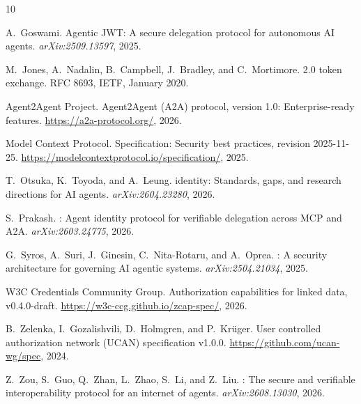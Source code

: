 \documentclass{article}
\begin{document}

\begin{thebibliography}{10}
\providecommand{\natexlab}[1]{#1}

A.~Goswami.
\newblock Agentic {JWT}: A secure delegation protocol for autonomous {AI} agents.
\newblock \emph{arXiv:2509.13597}, 2025.

M.~Jones, A.~Nadalin, B.~Campbell, J.~Bradley, and C.~Mortimore.
 2.0 token exchange.
\newblock RFC 8693, IETF, January 2020.

{Agent2Agent Project}.
\newblock Agent2{A}gent ({A}2{A}) protocol, version 1.0: Enterprise-ready features.
\newblock \url{https://a2a-protocol.org/}, 2026.

{Model Context Protocol}.
\newblock Specification: Security best practices, revision 2025-11-25.
\newblock \url{https://modelcontextprotocol.io/specification/}, 2025.

T.~Otsuka, K.~Toyoda, and A.~Leung.
 identity: Standards, gaps, and research directions for {AI} agents.
\newblock \emph{arXiv:2604.23280}, 2026.

S.~Prakash.
: Agent identity protocol for verifiable delegation across {MCP} and {A2A}.
\newblock \emph{arXiv:2603.24775}, 2026.

G.~Syros, A.~Suri, J.~Ginesin, C.~Nita-Rotaru, and A.~Oprea.
: A security architecture for governing {AI} agentic systems.
\newblock \emph{arXiv:2504.21034}, 2025.

{W3C Credentials Community Group}.
\newblock Authorization capabilities for linked data, v0.4.0-draft.
\newblock \url{https://w3c-ccg.github.io/zcap-spec/}, 2026.

B.~Zelenka, I.~Gozalishvili, D.~Holmgren, and P.~Kr\"uger.
\newblock User controlled authorization network ({UCAN}) specification v1.0.0.
\newblock \url{https://github.com/ucan-wg/spec}, 2024.

Z.~Zou, S.~Guo, Q.~Zhan, L.~Zhao, S.~Li, and Z.~Liu.
: The secure and verifiable interoperability protocol for an internet of agents.
\newblock \emph{arXiv:2608.13030}, 2026.

\end{thebibliography}
\end{document}
